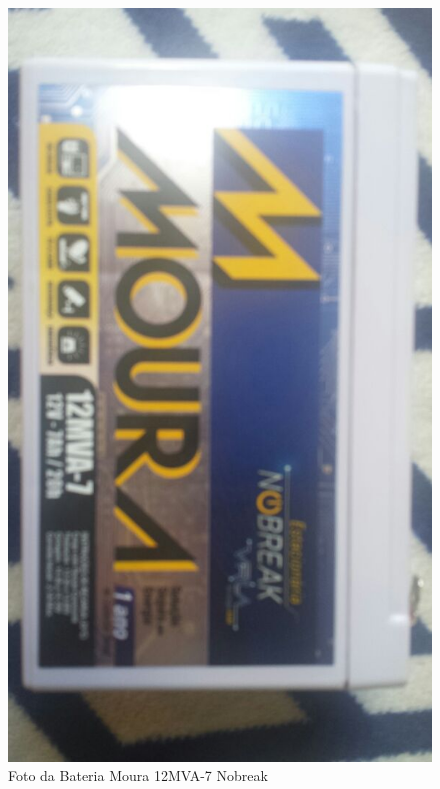 	\begin{figure}[!htb]
		\centering
		\includegraphics[scale=0.3, angle=90]{bateria_bike.jpeg}
		\caption{Foto da Bateria Moura 12MVA-7 Nobreak}
		\label{img:bateriabike}
	\end{figure}
	
